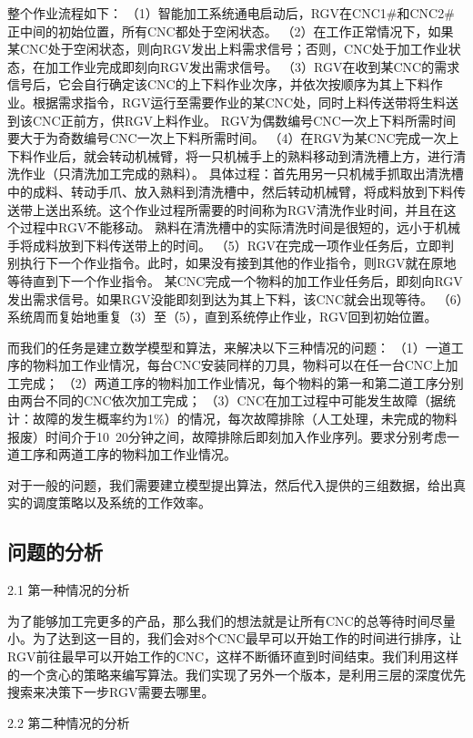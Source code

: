 \documentclass{cumcmthesis}
\begin{document}
整个作业流程如下：
（1）智能加工系统通电启动后，RGV在CNC1#和CNC2#正中间的初始位置，所有CNC都处于空闲状态。
（2）在工作正常情况下，如果某CNC处于空闲状态，则向RGV发出上料需求信号；否则，CNC处于加工作业状态，在加工作业完成即刻向RGV发出需求信号。
（3）RGV在收到某CNC的需求信号后，它会自行确定该CNC的上下料作业次序，并依次按顺序为其上下料作业。根据需求指令，RGV运行至需要作业的某CNC处，同时上料传送带将生料送到该CNC正前方，供RGV上料作业。
RGV为偶数编号CNC一次上下料所需时间要大于为奇数编号CNC一次上下料所需时间。
（4）在RGV为某CNC完成一次上下料作业后，就会转动机械臂，将一只机械手上的熟料移动到清洗槽上方，进行清洗作业（只清洗加工完成的熟料）。
具体过程：首先用另一只机械手抓取出清洗槽中的成料、转动手爪、放入熟料到清洗槽中，然后转动机械臂，将成料放到下料传送带上送出系统。这个作业过程所需要的时间称为RGV清洗作业时间，并且在这个过程中RGV不能移动。
熟料在清洗槽中的实际清洗时间是很短的，远小于机械手将成料放到下料传送带上的时间。
（5）RGV在完成一项作业任务后，立即判别执行下一个作业指令。此时，如果没有接到其他的作业指令，则RGV就在原地等待直到下一个作业指令。
某CNC完成一个物料的加工作业任务后，即刻向RGV发出需求信号。如果RGV没能即刻到达为其上下料，该CNC就会出现等待。
（6）系统周而复始地重复（3）至（5），直到系统停止作业，RGV回到初始位置。

而我们的任务是建立数学模型和算法，来解决以下三种情况的问题：
（1）一道工序的物料加工作业情况，每台CNC安装同样的刀具，物料可以在任一台CNC上加工完成；
（2）两道工序的物料加工作业情况，每个物料的第一和第二道工序分别由两台不同的CNC依次加工完成；
（3）CNC在加工过程中可能发生故障（据统计：故障的发生概率约为1\%）的情况，每次故障排除（人工处理，未完成的物料报废）时间介于10~20分钟之间，故障排除后即刻加入作业序列。要求分别考虑一道工序和两道工序的物料加工作业情况。

对于一般的问题，我们需要建立模型提出算法，然后代入提供的三组数据，给出真实的调度策略以及系统的工作效率。


\subsection{问题的分析}

2.1 第一种情况的分析

为了能够加工完更多的产品，那么我们的想法就是让所有CNC的总等待时间尽量小。为了达到这一目的，我们会对8个CNC最早可以开始工作的时间进行排序，让RGV前往最早可以开始工作的CNC，这样不断循环直到时间结束。我们利用这样的一个贪心的策略来编写算法。我们实现了另外一个版本，是利用三层的深度优先搜索来决策下一步RGV需要去哪里。

2.2 第二种情况的分析
\end{document}
